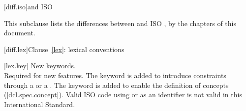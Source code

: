 
[diff.iso]{\Cpp and ISO }

\pnum
This subclause lists the differences between \Cpp
and ISO , by the chapters of this document.

[diff.lex]{Clause~\ref{lex}: lexical conventions}

\ref{lex.key}
\change New keywords.\\
\rationale Required for new features.
The  keyword is added
to introduce constraints through a  or
a . The  keyword is
added to enable the definition of concepts (\ref{dcl.spec.concept}).
\effect
Valid ISO  code using  or 
as an identifier is not valid in this International Standard.
